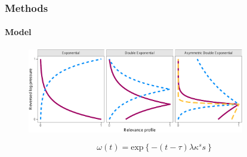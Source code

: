 \documentclass{snedecorbeamer}
\begin{document}
\begin{frame}[c]
  \frametitle{Methods}
  \framesubtitle{Model}

  \begin{figure}
    \centering
    \includegraphics[height=10em]{inc/mls_weight_profiles}
  \end{figure}

  \begin{equation}
    \omega(t)
    =
    \text{exp}\left\{-(t - \tau)\lambda\kappa^s s\right\}
  \end{equation}


  \blankfootnote{
    Space:
    $\omega(t): \mathcal{T} = [0, 1] \to (0, 1]$,
    $s = \text{sign}(t - \tau)$,
    $\tau\in[0,1]$,
    $\lambda > 0$,
    $\kappa > 0$ \\
    \hspace{3.25ex}
    Priors:
    $\indent\tau \sim \textsc{Beta}$,
    $\lambda \sim \textsc{N}^{+}$,
    $\log(\kappa) \sim \textsc{N}$
  }
\end{frame}
\end{document}
